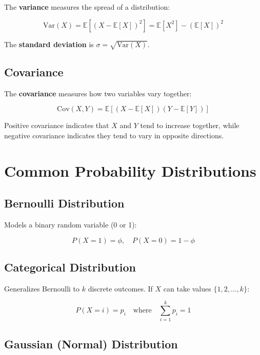The \textbf{variance} measures the spread of a distribution:

\begin{equation}
\text{Var}(X) = \mathbb{E}[(X - \mathbb{E}[X])^2] = \mathbb{E}[X^2] - (\mathbb{E}[X])^2
\end{equation}

The \textbf{standard deviation} is $\sigma = \sqrt{\text{Var}(X)}$.

\subsection{Covariance}

The \textbf{covariance} measures how two variables vary together:

\begin{equation}
\text{Cov}(X, Y) = \mathbb{E}[(X - \mathbb{E}[X])(Y - \mathbb{E}[Y])]
\end{equation}

Positive covariance indicates that $X$ and $Y$ tend to increase together, while negative covariance indicates they tend to vary in opposite directions.

\section{Common Probability Distributions}
\label{sec:common-distributions}

\subsection{Bernoulli Distribution}

Models a binary random variable (0 or 1):

\begin{equation}
P(X=1) = \phi, \quad P(X=0) = 1-\phi
\end{equation}

\subsection{Categorical Distribution}

Generalizes Bernoulli to $k$ discrete outcomes. If $X$ can take values $\{1, 2, \ldots, k\}$:

\begin{equation}
P(X=i) = p_i \quad \text{where} \quad \sum_{i=1}^{k} p_i = 1
\end{equation}

\subsection{Gaussian (Normal) Distribution}

